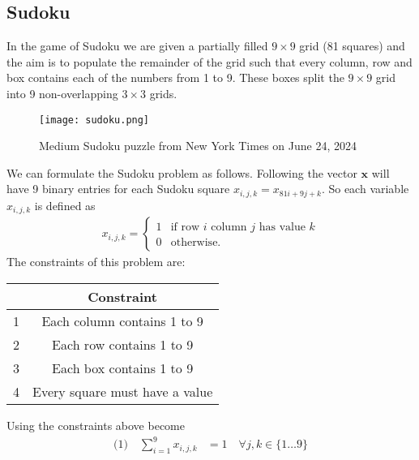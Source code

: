 \documentclass{article}
\begin{document}
\subsection{Sudoku}

In the game of Sudoku we are given a partially filled \(9 \times 9\) grid (81 squares) and the aim is to populate the remainder of the grid such that every column, row and box contains each of the numbers from 1 to 9. These boxes split the \(9 \times 9\) grid into 9 non-overlapping \(3 \times 3\) grids.

\begin{figure}[H]
    \centering
    \texttt{[image: sudoku.png]}
    \caption{Medium Sudoku puzzle from New York Times on June 24, 2024}
    \label{fig:Sudoku 1}
\end{figure}

\noindent We can formulate the Sudoku problem as follows. Following \cite[p.~1]{mücke2024sudoku} the vector \(\mathbf{x}\) will have 9 binary entries for each Sudoku square \(x_{i,j,k} = x_{81i + 9j + k}\). So each variable \(x_{i,j,k}\) is defined as
\begin{align*}
    x_{i,j,k} = \begin{cases}
        1 & \text{if row \(i\) column \(j\) has value \(k\)} \\
        0 & \text{otherwise.}
    \end{cases}
\end{align*}
The constraints of this problem are:
\begin{center}
\begin{tabular}{ |c|c| } 
 \hline
   & Constraint\\ 
 \hline
 1 & Each column contains 1 to 9\\ 
 2 & Each row contains 1 to 9\\
 3 & Each box contains 1 to 9\\
 4 & Every square must have a value\\
 \hline
\end{tabular}
\end{center}

\noindent Using \cite[p.~326]{ILPsudoku} the constraints above become
\begin{equation*}
\begin{aligned} 
\text{(1)} \quad \sum_{i=1}^9 x_{i,j,k} &= 1\quad \forall j,k \in \{1 \dots 9\} \\
\end{aligned}
\end{equation*}
\end{document}
